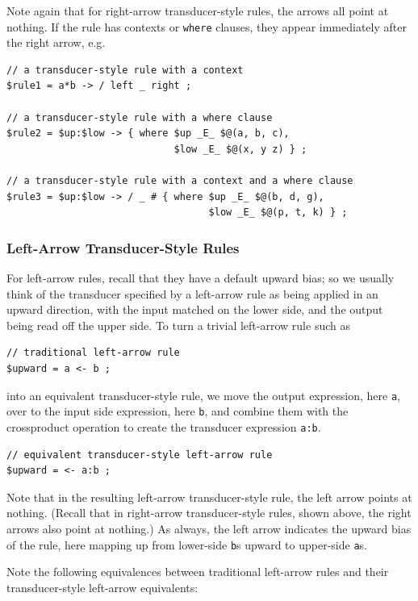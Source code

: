 Note again that for right-arrow transducer-style rules, the arrows all point at nothing.  If the rule
has contexts or \texttt{where} clauses, they appear immediately after the right arrow, e.g.

\begin{Verbatim}
// a transducer-style rule with a context
$rule1 = a*b -> / left _ right ;

// a transducer-style rule with a where clause
$rule2 = $up:$low -> { where $up _E_ $@(a, b, c),
	                         $low _E_ $@(x, y z) } ;

// a transducer-style rule with a context and a where clause
$rule3 = $up:$low -> / _ # { where $up _E_ $@(b, d, g),
	                               $low _E_ $@(p, t, k) } ;
\end{Verbatim}

\subsubsection{Left-Arrow Transducer-Style Rules}

For left-arrow rules, recall that they have a default upward bias; so we usually think of the transducer
specified by a left-arrow rule as being applied in an upward direction, with the input matched on the
lower side, and the output being read off the upper side.  To turn a trivial left-arrow rule such as

\begin{Verbatim}
// traditional left-arrow rule
$upward = a <- b ;
\end{Verbatim}

\noindent
into an equivalent transducer-style rule, we move the output expression, here \verb!a!, over to the
input side expression, here \verb!b!, and combine them with the crossproduct operation to create the
transducer expression \verb!a:b!.  

\begin{Verbatim}
// equivalent transducer-style left-arrow rule
$upward = <- a:b ;
\end{Verbatim}

\noindent
Note that in the resulting left-arrow transducer-style rule, the left arrow points at nothing.
(Recall that in right-arrow transducer-style rules, shown above, the right arrows also point at nothing.)  As
always, the left arrow indicates the upward bias of the rule, here mapping up from lower-side \verb!b!s upward to
upper-side \verb!a!s.

Note the following equivalences between traditional left-arrow rules and their
transducer-style left-arrow equivalents:

